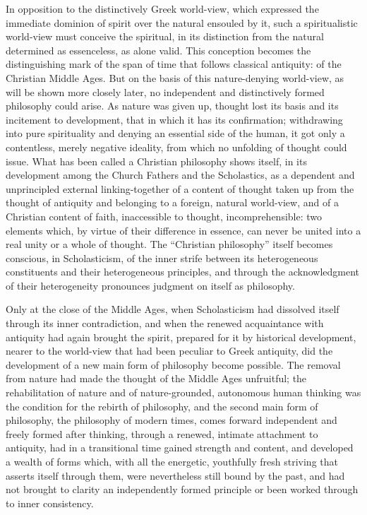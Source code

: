 In opposition to the distinctively Greek world-view, which expressed
the immediate dominion of spirit over the natural ensouled by it, such a
spiritualistic world-view must conceive the spiritual, in its
distinction from the natural determined as essenceless, as alone valid.
This conception becomes the distinguishing mark of the span of time that
follows classical antiquity: of the Christian Middle Ages. But on the
basis of this nature-denying world-view, as will be shown more closely
later, no independent and distinctively formed philosophy could arise.
As nature was given up, thought lost its basis and its incitement to
development, that in which it has its confirmation; withdrawing into
pure spirituality and denying an essential side of the human, it got
only a contentless, merely negative ideality, from which no unfolding of
thought could issue. What has been called a Christian philosophy shows
itself, in its development among the Church Fathers and the
Scholastics, as a dependent and unprincipled external linking-together
of a content of thought taken up from the thought of antiquity and
belonging to a foreign, natural world-view, and of a Christian content
of faith, inaccessible to thought, incomprehensible: two elements which,
by virtue of their difference in essence, can never be united into a
real unity or a whole of thought. The ``Christian philosophy'' itself
becomes conscious, in Scholasticism, of the inner strife between its
heterogeneous constituents and their heterogeneous principles, and
through the acknowledgment of their heterogeneity pronounces judgment
on itself as philosophy.

Only at the close of the Middle Ages, when Scholasticism had dissolved
itself through its inner contradiction, and when the renewed
acquaintance with antiquity had again brought the spirit, prepared for
it by historical development, nearer to the
world-view that had been peculiar to Greek antiquity, did the
development of a new main form of philosophy become possible. The
removal from nature had made the thought of the Middle Ages unfruitful;
the rehabilitation of nature and of nature-grounded, autonomous human
thinking was the condition for the rebirth of philosophy, and the second
main form of philosophy, the philosophy of modern times, comes forward
independent and freely formed after thinking, through a renewed,
intimate attachment to antiquity, had in a transitional time gained
strength and content, and developed a wealth of forms which, with all
the energetic, youthfully fresh striving that asserts itself through
them, were nevertheless still bound by the past, and had not brought to
clarity an independently formed principle or been worked through to
inner consistency.

